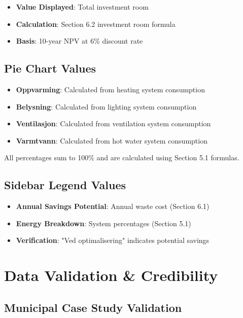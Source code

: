\documentclass[12pt,a4paper]{article}
\begin{document}
\begin{itemize}
\item \textbf{Value Displayed}: Total investment room
\item \textbf{Calculation}: Section 6.2 investment room formula
\item \textbf{Basis}: 10-year NPV at 6\% discount rate
\end{itemize}

\subsection{Pie Chart Values}

\begin{itemize}
\item \textbf{Oppvarming}: Calculated from heating system consumption
\item \textbf{Belysning}: Calculated from lighting system consumption
\item \textbf{Ventilasjon}: Calculated from ventilation system consumption
\item \textbf{Varmtvann}: Calculated from hot water system consumption
\end{itemize}

All percentages sum to 100\% and are calculated using Section 5.1 formulas.

\subsection{Sidebar Legend Values}

\begin{itemize}
\item \textbf{Annual Savings Potential}: Annual waste cost (Section 6.1)
\item \textbf{Energy Breakdown}: System percentages (Section 5.1)
\item \textbf{Verification}: "Ved optimalisering" indicates potential savings
\end{itemize}

\section{Data Validation \& Credibility}

\subsection{Municipal Case Study Validation}
\end{document}
